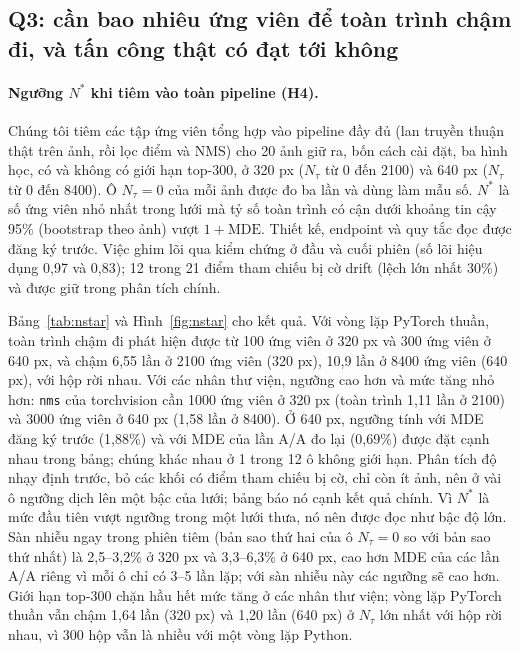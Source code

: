 \documentclass[12pt,a4paper]{article}
\newcommand{\Ntau}{N_{\tau}}
\begin{document}
\subsection{Q3: cần bao nhiêu ứng viên để toàn trình chậm đi, và tấn công thật có đạt tới không}
\label{sec:q3}
\paragraph{Ngưỡng $N^{*}$ khi tiêm vào toàn pipeline (H4).}
Chúng tôi tiêm các tập ứng viên tổng hợp vào pipeline đầy đủ (lan truyền thuận thật trên ảnh, rồi lọc điểm và NMS) cho 20 ảnh giữ ra, bốn cách cài đặt, ba hình học, có và không có giới hạn top-300, ở 320 px ($\Ntau$ từ 0 đến 2100) và 640 px ($\Ntau$ từ 0 đến 8400). Ô $\Ntau=0$ của mỗi ảnh được đo ba lần và dùng làm mẫu số. $N^{*}$ là số ứng viên nhỏ nhất trong lưới mà tỷ số toàn trình có cận dưới khoảng tin cậy 95\% (bootstrap theo ảnh) vượt $1+\mathrm{MDE}$. Thiết kế, endpoint và quy tắc đọc được đăng ký trước. Việc ghim lõi qua kiểm chứng ở đầu và cuối phiên (số lõi hiệu dụng 0,97 và 0,83); 12 trong 21 điểm tham chiếu bị cờ drift (lệch lớn nhất 30\%) và được giữ trong phân tích chính.

Bảng~\ref{tab:nstar} và Hình~\ref{fig:nstar} cho kết quả. Với vòng lặp PyTorch thuần, toàn trình chậm đi phát hiện được từ 100 ứng viên ở 320 px và 300 ứng viên ở 640 px, và chậm 6,55 lần ở 2100 ứng viên (320 px), 10,9 lần ở 8400 ứng viên (640 px), với hộp rời nhau. Với các nhân thư viện, ngưỡng cao hơn và mức tăng nhỏ hơn: \texttt{nms} của torchvision cần 1000 ứng viên ở 320 px (toàn trình 1,11 lần ở 2100) và 3000 ứng viên ở 640 px (1,58 lần ở 8400). Ở 640 px, ngưỡng tính với MDE đăng ký trước (1,88\%) và với MDE của lần A/A đo lại (0,69\%) được đặt cạnh nhau trong bảng; chúng khác nhau ở 1 trong 12 ô không giới hạn. Phân tích độ nhạy định trước, bỏ các khối có điểm tham chiếu bị cờ, chỉ còn ít ảnh, nên ở vài ô ngưỡng dịch lên một bậc của lưới; bảng báo nó cạnh kết quả chính. Vì $N^{*}$ là mức đầu tiên vượt ngưỡng trong một lưới thưa, nó nên được đọc như bậc độ lớn. Sàn nhiễu ngay trong phiên tiêm (bản sao thứ hai của ô $\Ntau=0$ so với bản sao thứ nhất) là 2,5--3,2\% ở 320 px và 3,3--6,3\% ở 640 px, cao hơn MDE của các lần A/A riêng vì mỗi ô chỉ có 3--5 lần lặp; với sàn nhiễu này các ngưỡng sẽ cao hơn. Giới hạn top-300 chặn hầu hết mức tăng ở các nhân thư viện; vòng lặp PyTorch thuần vẫn chậm 1,64 lần (320 px) và 1,20 lần (640 px) ở $\Ntau$ lớn nhất với hộp rời nhau, vì 300 hộp vẫn là nhiều với một vòng lặp Python.
\end{document}
